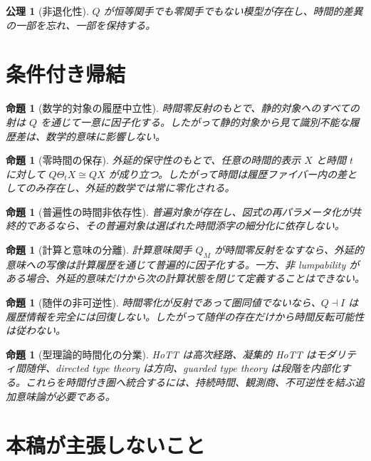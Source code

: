 \documentclass[a4paper,11pt]{ltjsarticle}
\newtheorem{axiom}[definition]{公理}
\newtheorem{proposition}[definition]{命題}
\theoremstyle{remark}
\begin{document}
\begin{axiom}[非退化性]
$Q$ が恒等関手でも零関手でもない模型が存在し、時間的差異の一部を忘れ、一部を保持する。
\end{axiom}

\section{条件付き帰結}

\begin{proposition}[数学的対象の履歴中立性]
時間零反射のもとで、静的対象へのすべての射は $Q$ を通じて一意に因子化する。したがって静的対象から見て識別不能な履歴差は、数学的意味に影響しない。
\end{proposition}

\begin{proposition}[零時間の保存]
外延的保守性のもとで、任意の時間的表示 $X$ と時間 $t$ に対して $Q\Theta_tX\cong QX$ が成り立つ。したがって時間は履歴ファイバー内の差としてのみ存在し、外延的数学では常に零化される。
\end{proposition}

\begin{proposition}[普遍性の時間非依存性]
普遍対象が存在し、図式の再パラメータ化が共終的であるなら、その普遍対象は選ばれた時間添字の細分化に依存しない。
\end{proposition}

\begin{proposition}[計算と意味の分離]
計算意味関手 $Q_M$ が時間零反射をなすなら、外延的意味への写像は計算履歴を通じて普遍的に因子化する。一方、非 lumpability がある場合、外延的意味だけから次の計算状態を閉じて定義することはできない。
\end{proposition}

\begin{proposition}[随伴の非可逆性]
時間零化が反射であって圏同値でないなら、$Q\dashv I$ は履歴情報を完全には回復しない。したがって随伴の存在だけから時間反転可能性は従わない。
\end{proposition}

\begin{proposition}[型理論的時間化の分業]
HoTT は高次経路、凝集的 HoTT はモダリティ間随伴、directed type theory は方向、guarded type theory は段階を内部化する。これらを時間付き圏へ統合するには、持続時間、観測商、不可逆性を結ぶ追加意味論が必要である。
\end{proposition}

\section{本稿が主張しないこと}
\end{document}
